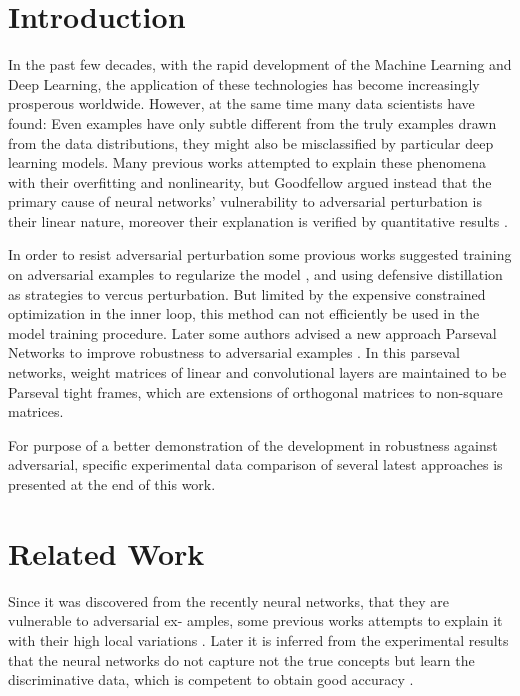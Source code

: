 \chapter{Introduction}

In the past few decades, with the rapid development of the Machine Learning and Deep Learning, the application of these technologies has become increasingly prosperous worldwide. However, at the same time many data scientists have found: Even examples have only subtle different from the truly examples drawn from the data distributions, they might also be misclassified by particular deep learning models. Many previous works attempted to explain these phenomena with their overfitting and nonlinearity, but Goodfellow argued instead that the primary cause of neural networks' vulnerability to adversarial perturbation is their linear nature, moreover their explanation is verified by quantitative results \cite{goodfellow2014explaining} .

In order to resist adversarial perturbation some provious works suggested training on adversarial examples to regularize the model \cite{goodfellow2014explaining}, and using defensive distillation as strategies to vercus perturbation. But limited by the expensive constrained optimization in the inner loop, this method can not efficiently be used in the model training procedure. Later some authors advised a new approach Parseval Networks to improve robustness to adversarial examples \cite{cisse2017parseval}. In this parseval networks, weight matrices of linear and convolutional layers are maintained to be Parseval tight frames, which are extensions of orthogonal matrices to non-square matrices.

For purpose of a better demonstration of the development in robustness against adversarial, specific experimental data comparison of several latest approaches is presented at the end of this work.

\chapter{Related Work}

Since it was discovered from the recently neural networks, that they are vulnerable to adversarial ex-
amples, some previous works attempts to explain it with their high local variations \cite{szegedy2013intriguing}. Later it is inferred from the experimental results that the neural networks do not capture not the true concepts but learn the discriminative data, which is competent to obtain good accuracy \cite{fawzi2018analysis}.

